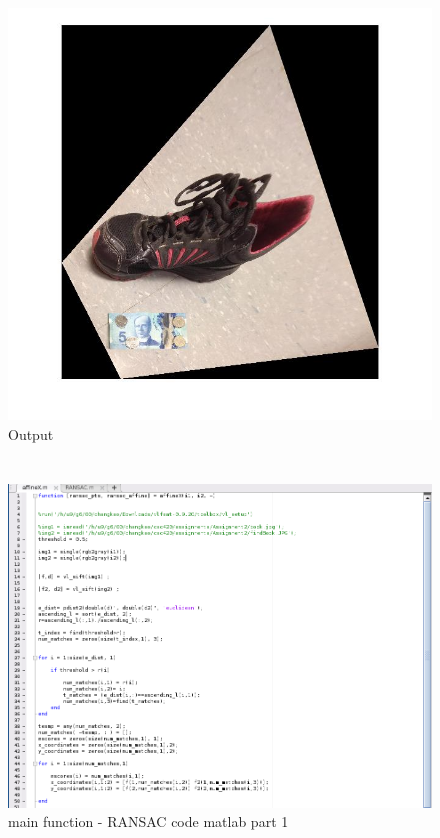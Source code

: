 \documentclass[]{article}
\begin{document}
\begin{figure}[h!]
\centering
\includegraphics[width=1.15\textwidth]{img/q1.jpg}
\caption{Output}
\end{figure}

\section{}
\begin{figure}[h!]
\centering
\includegraphics[width=1.35\textwidth]{img/affine1.png}
\caption{main function - RANSAC code matlab part 1}
\end{figure}
\end{document}
